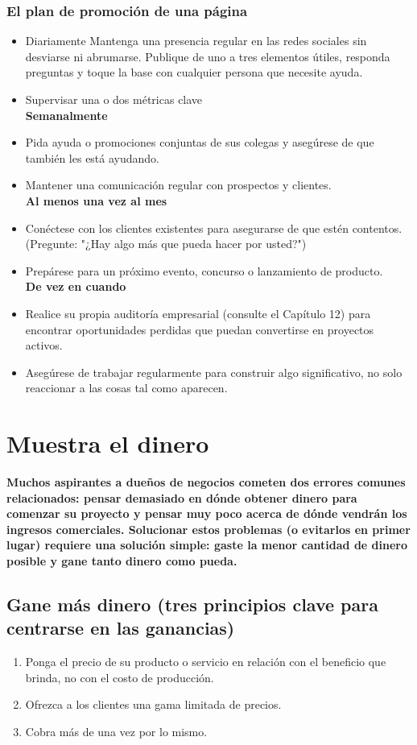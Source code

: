 \documentclass[10pt]{book}
\begin{document}
	    \subsection{El plan de promoción de una página}
	    \begin{itemize} 
		\item Diariamente Mantenga una presencia regular en las redes sociales sin desviarse ni abrumarse. Publique de uno a tres elementos útiles, responda preguntas y toque la base con cualquier persona que necesite ayuda.
		\item Supervisar una o dos métricas clave\\
	    \textbf{Semanalmente}
		\item Pida ayuda o promociones conjuntas de sus colegas y asegúrese de que también les está ayudando.
		\item Mantener una comunicación regular con prospectos y clientes.\\
	    \textbf{Al menos una vez al mes}
		\item Conéctese con los clientes existentes para asegurarse de que estén contentos. (Pregunte: "¿Hay algo más que pueda hacer por usted?")
		\item Prepárese para un próximo evento, concurso o lanzamiento de producto.\\
	    \textbf{De vez en cuando}
		\item Realice su propia auditoría empresarial (consulte el Capítulo 12) para encontrar oportunidades perdidas que puedan convertirse en proyectos activos.
		\item Asegúrese de trabajar regularmente para construir algo significativo, no solo reaccionar a las cosas tal como aparecen.
	    \end{itemize}

    \chapter{Muestra el dinero}
	\textbf{Muchos aspirantes a dueños de negocios cometen dos errores comunes relacionados: pensar demasiado en dónde obtener dinero para comenzar su proyecto y pensar muy poco acerca de dónde vendrán los ingresos comerciales. Solucionar estos problemas (o evitarlos en primer lugar) requiere una solución simple: gaste la menor cantidad de dinero posible y gane tanto dinero como pueda.}

	\section{Gane más dinero (tres principios clave para centrarse en las ganancias)}
	    \begin{enumerate}[\bfseries 1.]	
		    \item Ponga el precio de su producto o servicio en relación con el beneficio que brinda, no con el costo de producción.
		    \item Ofrezca a los clientes una gama limitada de precios.
		    \item Cobra más de una vez por lo mismo.
	    \end{enumerate}
		
\end{document}
